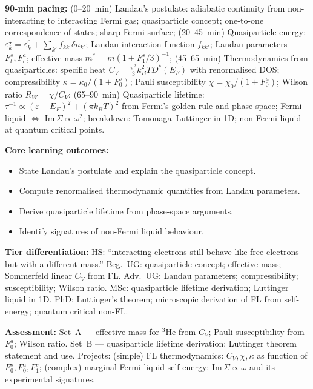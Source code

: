 \documentclass[11pt,a4paper]{article}
\begin{document}
\medskip

\begin{tcolorbox}[modulebox, title={Module~II.7 / L05: Fermi Liquid Theory}]
\textbf{90-min pacing:} (0--20~min) Landau's postulate: adiabatic continuity from non-interacting to interacting Fermi gas; quasiparticle concept; one-to-one correspondence of states; sharp Fermi surface; (20--45~min) Quasiparticle energy: $\varepsilon_k^\star=\varepsilon_k^0+\sum_{k'}f_{kk'}\delta n_{k'}$; Landau interaction function $f_{kk'}$; Landau parameters $F_l^s,F_l^a$; effective mass $m^*=m(1+F_1^s/3)^{-1}$; (45--65~min) Thermodynamics from quasiparticles: specific heat $C_V=\tfrac{\pi^2}{3}k_B^2T D^*(E_F)$ with renormalised DOS; compressibility $\kappa=\kappa_0/(1+F_0^s)$; Pauli susceptibility $\chi=\chi_0/(1+F_0^a)$; Wilson ratio $R_W=\chi/C_V$; (65--90~min) Quasiparticle lifetime: $\tau^{-1}\propto(\varepsilon-E_F)^2+(\pi k_BT)^2$ from Fermi's golden rule and phase space; Fermi liquid $\Leftrightarrow$ Im$\,\Sigma\propto\omega^2$; breakdown: Tomonaga--Luttinger in 1D; non-Fermi liquid at quantum critical points.

\medskip\textbf{Core learning outcomes:}
\begin{itemize}[leftmargin=1.4em,topsep=2pt,itemsep=1pt]
  \item State Landau's postulate and explain the quasiparticle concept.
  \item Compute renormalised thermodynamic quantities from Landau parameters.
  \item Derive quasiparticle lifetime from phase-space arguments.
  \item Identify signatures of non-Fermi liquid behaviour.
\end{itemize}

\medskip\textbf{Tier differentiation:}
HS: ``interacting electrons still behave like free electrons but with a different mass.''
Beg.\ UG: quasiparticle concept; effective mass; Sommerfeld linear $C_V$ from FL.
Adv.\ UG: Landau parameters; compressibility; susceptibility; Wilson ratio.
MSc: quasiparticle lifetime derivation; Luttinger liquid in 1D.
PhD: Luttinger's theorem; microscopic derivation of FL from self-energy; quantum critical non-FL.

\medskip\textbf{Assessment:}
Set~A --- effective mass for $^3$He from $C_V$; Pauli susceptibility from $F_0^a$; Wilson ratio.
Set~B --- quasiparticle lifetime derivation; Luttinger theorem statement and use.
Projects: (simple) FL thermodynamics: $C_V,\chi,\kappa$ as function of $F_0^s,F_0^a,F_1^s$;
(complex) marginal Fermi liquid self-energy: Im$\,\Sigma\propto\omega$ and its experimental signatures.
\end{tcolorbox}
\end{document}
